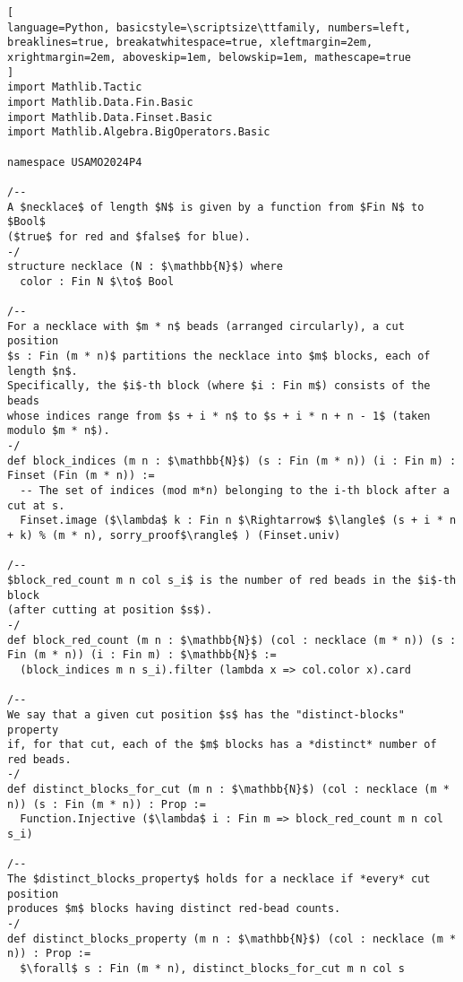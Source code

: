 \begin{tcolorbox}[enhanced, breakable, rounded corners,
    colback=green!5!white, colframe=green!75!black,
    colbacktitle=green!85!black, fonttitle=\bfseries, coltitle=white, title=Lean Theorem for 2024 USAMO Problem 4]
\setlength{\parskip}{1em}
\begin{lstlisting}[
language=Python, basicstyle=\scriptsize\ttfamily, numbers=left, breaklines=true, breakatwhitespace=true, xleftmargin=2em, xrightmargin=2em, aboveskip=1em, belowskip=1em, mathescape=true
]
import Mathlib.Tactic
import Mathlib.Data.Fin.Basic
import Mathlib.Data.Finset.Basic
import Mathlib.Algebra.BigOperators.Basic

namespace USAMO2024P4

/--
A $necklace$ of length $N$ is given by a function from $Fin N$ to $Bool$
($true$ for red and $false$ for blue).
-/
structure necklace (N : $\mathbb{N}$) where
  color : Fin N $\to$ Bool

/--
For a necklace with $m * n$ beads (arranged circularly), a cut position
$s : Fin (m * n)$ partitions the necklace into $m$ blocks, each of length $n$.
Specifically, the $i$-th block (where $i : Fin m$) consists of the beads
whose indices range from $s + i * n$ to $s + i * n + n - 1$ (taken modulo $m * n$).
-/
def block_indices (m n : $\mathbb{N}$) (s : Fin (m * n)) (i : Fin m) : Finset (Fin (m * n)) :=
  -- The set of indices (mod m*n) belonging to the i-th block after a cut at s.
  Finset.image ($\lambda$ k : Fin n $\Rightarrow$ $\langle$ (s + i * n + k) % (m * n), sorry_proof$\rangle$ ) (Finset.univ)

/--
$block_red_count m n col s_i$ is the number of red beads in the $i$-th block
(after cutting at position $s$).
-/
def block_red_count (m n : $\mathbb{N}$) (col : necklace (m * n)) (s : Fin (m * n)) (i : Fin m) : $\mathbb{N}$ :=
  (block_indices m n s_i).filter (lambda x => col.color x).card

/--
We say that a given cut position $s$ has the "distinct-blocks" property
if, for that cut, each of the $m$ blocks has a *distinct* number of red beads.
-/
def distinct_blocks_for_cut (m n : $\mathbb{N}$) (col : necklace (m * n)) (s : Fin (m * n)) : Prop :=
  Function.Injective ($\lambda$ i : Fin m => block_red_count m n col s_i)

/--
The $distinct_blocks_property$ holds for a necklace if *every* cut position
produces $m$ blocks having distinct red-bead counts.
-/
def distinct_blocks_property (m n : $\mathbb{N}$) (col : necklace (m * n)) : Prop :=
  $\forall$ s : Fin (m * n), distinct_blocks_for_cut m n col s


\end{lstlisting}
\end{tcolorbox}
